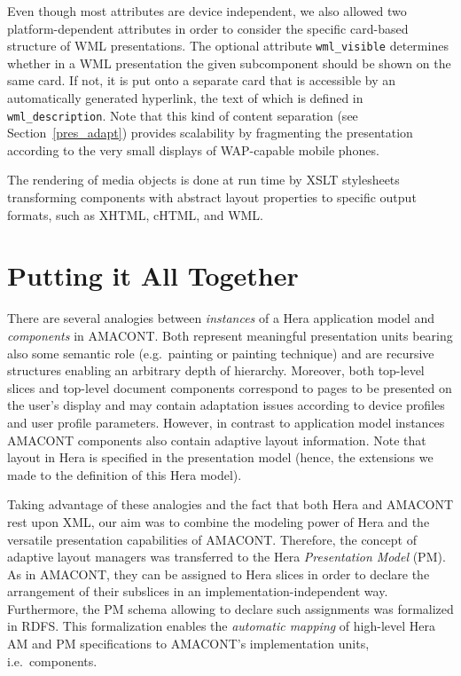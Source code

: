 \documentclass[oribibl]{llncs}
\begin{document}
Even though most attributes are device independent, we also allowed two platform-dependent attributes in order to consider the specific card-based structure of WML presentations. 
The optional attribute \texttt{wml\_visible} determines whether in a WML presentation the given subcomponent should be shown on the same card.
If not, it is put onto a separate card that is accessible by an automatically generated hyperlink, the text of which is defined in \texttt{wml\_description}.
Note that this kind of content separation (see Section~\ref{pres_adapt}) provides scalability by fragmenting the presentation according to the very small displays of WAP-capable mobile phones. 

The rendering of media objects is done at run time by XSLT stylesheets transforming components with abstract layout properties to specific output formats, such as XHTML, cHTML, and WML. 


\section{Putting it All Together}
\label{transformation}

There are several analogies between \emph{instances} of a Hera application model and \emph{components} in AMACONT.
Both represent meaningful presentation units bearing also some semantic role (e.g.\ painting or painting
technique) and are recursive structures enabling an arbitrary depth of
hierarchy. 
Moreover, both top-level slices and top-level document components correspond to pages to be presented on the user's display and may contain adaptation issues according to device profiles and user profile parameters.
However, in contrast to application model instances AMACONT components also contain adaptive layout information.
Note that layout in Hera is specified in the presentation model (hence, the extensions we made to the definition of this Hera model).

Taking advantage of these analogies and the fact that both Hera and AMACONT rest upon XML, our aim was to combine the modeling power of Hera and the versatile presentation capabilities of AMACONT.
Therefore, the concept of adaptive layout managers was transferred to the Hera \emph{Presentation Model} (PM).
As in AMACONT, they can be assigned to Hera slices in order to declare the arrangement of their subslices in an implementation-independent way.
Furthermore, the PM schema allowing to declare such assignments was formalized in RDFS.
This formalization enables the \emph{automatic mapping} of high-level Hera AM and PM specifications to AMACONT's implementation units, i.e.\ components.
\end{document}
